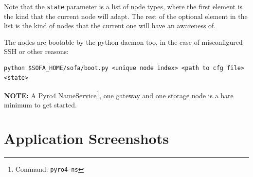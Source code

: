 Note that the \texttt{state} parameter is a list of node types, where the first element is the kind that the current node will adapt. The rest of the optional element in the list is the kind of nodes that the current one will have an awareness of.
\newline

The nodes are bootable by the python daemon too, in the case of misconfigured SSH or other reasons:
\vspace*{2mm}

\begin{lstlisting}[numbers=none, backgroundcolor=\color{sourcebackground}, rulecolor=\color{sourcebackground}, framextopmargin=5pt, framexbottommargin=5pt, frame=tb, xrightmargin=15pt, commentstyle=\color{bashcommetcolor}, showstringspaces=false, deletendkeywords={file, list}]
	python $SOFA_HOME/sofa/boot.py <unique node index> <path to cfg file> <state>
\end{lstlisting}	

{\sffamily\textbf{NOTE:}} A Pyro4 NameService\footnote{Command: \texttt{pyro4-ns}}, one gateway and one storage node is a bare minimum to get started.

\chapter{Application Screenshots} \label{chp:app-screenshots}

